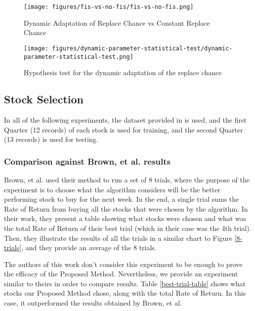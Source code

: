 \documentclass[12pt,journal,draftcls,onecolumn]{IEEEtran}
\begin{document}
\begin{figure}[htp]
\caption{Dynamic Adaptation of Replace Chance vs Constant Replace
  Chance}
\label{with-vs-without-dynamic}
\begin{center}
\texttt{[image: figures/fis-vs-no-fis/fis-vs-no-fis.png]}
\end{center}
\end{figure}

\begin{figure}[htp]
\caption{Hypothesis test for the dynamic adaptation of the replace
  chance}
\label{dynamic-hypothesis-test}
\begin{center}
\texttt{[image: figures/dynamic-parameter-statistical-test/dynamic-parameter-statistical-test.png]}
\end{center}
\end{figure}

\subsection{Stock Selection}

In all of the following experiments, the dataset provided in \cite{brown2013dynamic} is used, and the first Quarter (12 records) of each stock is used for training, and the second Quarter (13 records) is used for testing.

\subsubsection{Comparison against Brown, et al. results}

Brown, et al. \cite{brown2013dynamic} used their method to run a set of 8 trials, where the purpose of the experiment is to choose what the algorithm considers will be the better performing stock to buy for the next week. In the end, a single trial sums the Rate of Return from buying all the stocks that were chosen by the algorithm. In their work, they present a table showing what stocks were chosen and what was the total Rate of Return of their best trial (which in their case was the 4th trial). Then, they illustrate the results of all the trials in a similar chart to Figure \ref{8-trials}, and they provide an average of the 8 trials.

The authors of this work don't consider this experiment to be enough to prove the efficacy of the Proposed Method. Nevertheless, we provide an experiment similar to theirs in order to compare results. Table \ref{best-trial-table} shows what stocks our Proposed Method chose, along with the total Rate of Return. In this case, it outperformed the results obtained by Brown, et al.
    
\end{document}
